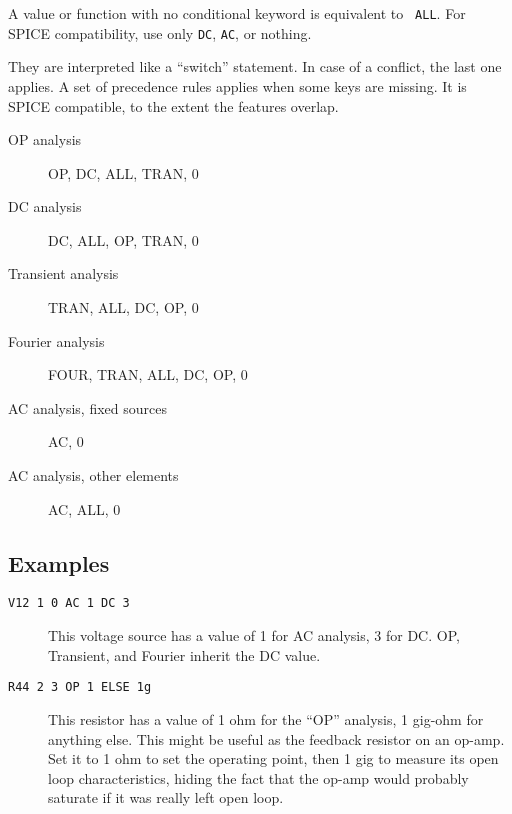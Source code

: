 A value or function with no conditional keyword is equivalent to {\tt
ALL}.  For SPICE compatibility, use only {\tt DC}, {\tt AC}, or nothing.

They are interpreted like a ``switch'' statement.  In case of a
conflict, the last one applies.  A set of precedence rules applies
when some keys are missing.  It is SPICE compatible, to the extent the
features overlap.

\begin{description}

\item[{OP analysis}] OP, DC, ALL, TRAN, 0
\item[{DC analysis}] DC, ALL, OP, TRAN, 0
\item[{Transient analysis}] TRAN, ALL, DC, OP, 0
\item[{Fourier analysis}] FOUR, TRAN, ALL, DC, OP, 0
\item[{AC analysis, fixed sources}] AC, 0
\item[{AC analysis, other elements}] AC, ALL, 0

\end{description}
\subsection{Examples}

\begin{description}

\item[{\tt V12 1 0 AC 1 DC 3}] This voltage source has a value of 1
for AC analysis, 3 for DC.  OP, Transient, and Fourier inherit the DC value.

\item[{\tt R44 2 3 OP 1 ELSE 1g}] This resistor has a value of 1 ohm
for the ``OP'' analysis, 1 gig-ohm for anything else.  This might be
useful as the feedback resistor on an op-amp.  Set it to 1 ohm to set
the operating point, then 1 gig to measure its open loop
characteristics, hiding the fact that the op-amp would probably
saturate if it was really left open loop.

\end{description}
